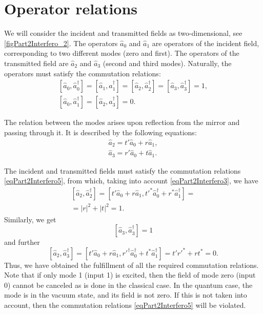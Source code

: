 \section{Operator relations}
We will consider the incident and transmitted fields as two-dimensional,
see \autoref{figPart2Interfero_2}. The operators $\hat{a}_0$ and 
$\hat{a}_1$ are operators of the incident field, corresponding to two different modes
(zero and first). The operators of the transmitted field are $\hat{a}_2$ and 
$\hat{a}_3$ (second and third modes). Naturally, the operators must
satisfy the commutation relations:
\begin{eqnarray}
\left[\hat{a}_0, \hat{a}_0^{\dag}\right] = 
\left[\hat{a}_1, \hat{a}_1^{\dag}\right] = 
\left[\hat{a}_2, \hat{a}_2^{\dag}\right] = 
\left[\hat{a}_3, \hat{a}_3^{\dag}\right] = 1,
\nonumber \\
\left[\hat{a}_0, \hat{a}_1^{\dag}\right] = 
\left[\hat{a}_2, \hat{a}_3^{\dag}\right] = 0.
\label{eqPart2Interfero5}
\end{eqnarray}



The relation between the modes arises upon reflection from the mirror and
passing through it. It is described by the following equations:
\begin{eqnarray}
\hat{a}_2 = t' \hat{a}_0 + r \hat{a}_1,
\nonumber \\
\hat{a}_3 = r' \hat{a}_0 + t \hat{a}_1.
\label{eqPart2Interfero6}
\end{eqnarray}

The incident and transmitted fields must satisfy the commutation relations \eqref{eqPart2Interfero5}, from which, taking into account 
\eqref{eqPart2Interfero3}, we have
\begin{eqnarray}
\left[\hat{a}_2, \hat{a}_2^{\dag}\right] = 
\left[t' \hat{a}_0 + r \hat{a}_1, t'^{*} \hat{a}_0^{\dag} + r^{*}
  \hat{a}_1^{\dag}\right] =
\nonumber \\ = 
\left|r\right|^2 + \left|t\right|^2 = 1.
\label{eqPart2InterferoTask2a}
\end{eqnarray}
Similarly, we get 
\begin{equation}
\left[\hat{a}_3, \hat{a}_3^{\dag}\right] = 1 
\label{eqPart2InterferoTask2b}
\end{equation}
and further
\begin{equation}
\left[\hat{a}_2, \hat{a}_3^{\dag}\right] = 
\left[t' \hat{a}_0 + r \hat{a}_1, 
r'^{\dag} \hat{a}_0^{\dag} + t^{*} \hat{a}_1^{\dag}\right] = 
t' r'^{*} + r t^{*} = 0.
\label{eqPart2InterferoTask2c}
\end{equation}
Thus, we have obtained the fulfillment of all the required commutation relations. Note that if only mode 1 (input 1) is excited, then the field of mode zero (input 0) cannot be canceled as is done in
the classical case. In the quantum case, the mode is in the vacuum state, and its field is not zero. If this is not taken into account, then the commutation relations \eqref{eqPart2Interfero5} will be violated.

